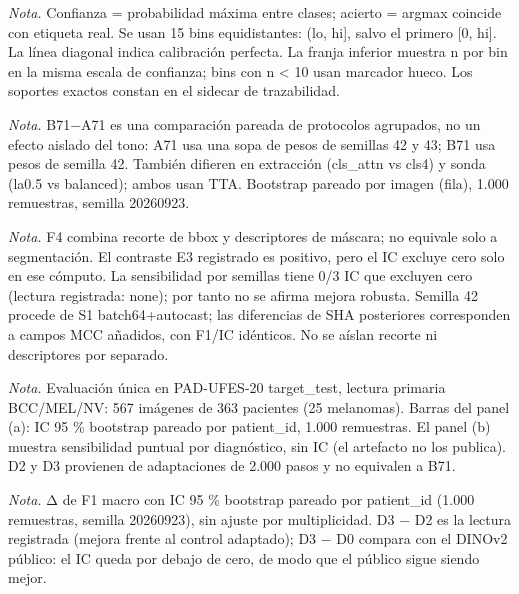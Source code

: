 \caption{Confiabilidad de las probabilidades por clase predicha en ISIC 2020 · ajuste supervisado.}
\textit{Nota.} Confianza = probabilidad máxima entre clases; acierto = argmax coincide con etiqueta real. Se usan 15 bins equidistantes: (lo, hi], salvo el primero [0, hi]. La línea diagonal indica calibración perfecta. La franja inferior muestra n por bin en la misma escala de confianza; bins con n < 10 usan marcador hueco. Los soportes exactos constan en el sidecar de trazabilidad.

\caption{Comparación pareada A71 frente a B71 en HAM10000; extracción y sonda cambian junto con el protocolo.}
\textit{Nota.} B71−A71 es una comparación pareada de protocolos agrupados, no un efecto aislado del tono: A71 usa una sopa de pesos de semillas 42 y 43; B71 usa pesos de semilla 42. También difieren en extracción (cls\_attn vs cls4) y sonda (la0.5 vs balanced); ambos usan TTA. Bootstrap pareado por imagen (fila), 1.000 remuestras, semilla 20260923.

\caption{Contraste pareado de F1 macro B71+F4 frente a B71 y sensibilidad del resultado por semilla.}
\textit{Nota.} F4 combina recorte de bbox y descriptores de máscara; no equivale solo a segmentación. El contraste E3 registrado es positivo, pero el IC excluye cero solo en ese cómputo. La sensibilidad por semillas tiene 0/3 IC que excluyen cero (lectura registrada: none); por tanto no se afirma mejora robusta. Semilla 42 procede de S1 batch64+autocast; las diferencias de SHA posteriores corresponden a campos MCC añadidos, con F1/IC idénticos. No se aíslan recorte ni descriptores por separado.

\caption{F1 macro con IC 95 \% y sensibilidad por diagnóstico de D0 a D3 en PAD-UFES-20 (target\_test, BCC/MEL/NV).}
\textit{Nota.} Evaluación única en PAD-UFES-20 target\_test, lectura primaria BCC/MEL/NV: 567 imágenes de 363 pacientes (25 melanomas). Barras del panel (a): IC 95 \% bootstrap pareado por patient\_id, 1.000 remuestras. El panel (b) muestra sensibilidad puntual por diagnóstico, sin IC (el artefacto no los publica). D2 y D3 provienen de adaptaciones de 2.000 pasos y no equivalen a B71.

\caption{Contrastes pareados de F1 macro en PAD-UFES-20 con IC 95 \%: D3 − D2, D3 − D1 y D3 − D0.}
\textit{Nota.} Δ de F1 macro con IC 95 \% bootstrap pareado por patient\_id (1.000 remuestras, semilla 20260923), sin ajuste por multiplicidad. D3 − D2 es la lectura registrada (mejora frente al control adaptado); D3 − D0 compara con el DINOv2 público: el IC queda por debajo de cero, de modo que el público sigue siendo mejor.

